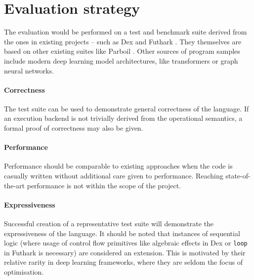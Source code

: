 \section{Evaluation strategy}


The evaluation would be performed on a test and benchmark suite derived from the ones in existing projects -- such as Dex \cite{paszke2021getting} and Futhark \cite{henriksen2017futhark}. They themselves are based on other existing suites like Parboil . Other sources of program samples include modern deep learning model architectures, like transformers or graph neural networks.
\paragraph{Correctness} The test suite can be used to demonstrate general correctness of the language. If an execution backend is not trivially derived from the operational semantics, a formal proof of correctness may also be given.

\paragraph{Performance} Performance should be comparable to existing approaches when the code is casually written without additional care given to performance. Reaching state-of-the-art performance is not within the scope of the project.

\paragraph{Expressiveness} Successful creation of a representative test suite will demonstrate the expressiveness of the language. It should be noted that instances of sequential logic (where usage of control flow primitives like algebraic effects in Dex or \texttt{loop} in Futhark is necessary) are considered an extension. This is motivated by their relative rarity in deep learning frameworks, where they are seldom the focus of optimisation.



